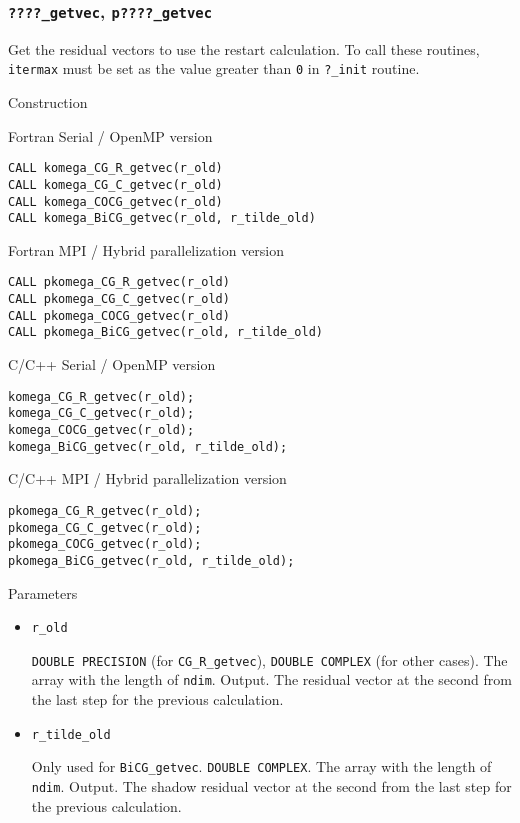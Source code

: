 \documentclass[12pt,titlepage]{article}
\begin{document}
\subsubsection{\texttt{????\_getvec}, \texttt{p????\_getvec}}

Get the residual vectors to use the restart calculation.
To call these routines, 
\verb|itermax| must be set as the value greater than \verb|0| in \verb|?_init| routine.

\noindent Construction

\noindent Fortran Serial / OpenMP version
\begin{verbatim}
CALL komega_CG_R_getvec(r_old)
CALL komega_CG_C_getvec(r_old)
CALL komega_COCG_getvec(r_old)
CALL komega_BiCG_getvec(r_old, r_tilde_old)
\end{verbatim}

\noindent Fortran MPI / Hybrid parallelization version
\begin{verbatim}
CALL pkomega_CG_R_getvec(r_old)
CALL pkomega_CG_C_getvec(r_old)
CALL pkomega_COCG_getvec(r_old)
CALL pkomega_BiCG_getvec(r_old, r_tilde_old)
\end{verbatim}

\noindent C/C++ Serial / OpenMP version
\begin{verbatim}
komega_CG_R_getvec(r_old);
komega_CG_C_getvec(r_old);
komega_COCG_getvec(r_old);
komega_BiCG_getvec(r_old, r_tilde_old);
\end{verbatim}

\noindent C/C++ MPI / Hybrid parallelization version
\begin{verbatim}
pkomega_CG_R_getvec(r_old);
pkomega_CG_C_getvec(r_old);
pkomega_COCG_getvec(r_old);
pkomega_BiCG_getvec(r_old, r_tilde_old);
\end{verbatim}

\noindent Parameters

\begin{itemize}
  
\item \verb|r_old|

  \verb|DOUBLE PRECISION| (for \verb|CG_R_getvec|),
  \verb|DOUBLE COMPLEX| (for other cases).
  The array with the length of \verb|ndim|. Output.
  The residual vector at the second from the last step for the previous calculation.

\item \verb|r_tilde_old|

  Only used for \verb|BiCG_getvec|.
  \verb|DOUBLE COMPLEX|.
  The array with the length of \verb|ndim|. Output.
  The shadow residual vector at the second from the last step for the previous calculation.

\end{itemize}
\end{document}
